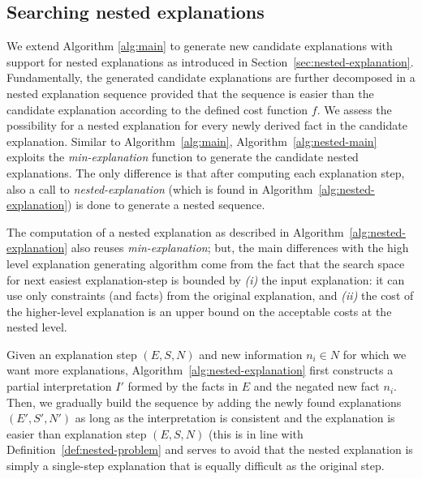 \subsection{Searching nested explanations}

We extend Algorithm \ref{alg:main} to generate new candidate explanations with support for nested explanations as introduced in Section~\ref{sec:nested-explanation}.
Fundamentally, the generated candidate explanations are further decomposed in a nested explanation sequence provided that the sequence is easier than the candidate explanation according to the defined cost function $f$. 
We assess the possibility for a nested explanation for every newly derived fact in the candidate explanation. 
Similar to Algorithm~\ref{alg:main}, Algorithm~\ref{alg:nested-main} exploits the \textit{min-explanation} function to generate the candidate nested explanations. 
The only difference is that after computing each explanation step, also a call to \textit{nested-explanation} (which is found in Algorithm~\ref{alg:nested-explanation}) is done to generate a nested sequence. 


The computation of a nested explanation as described in Algorithm~\ref{alg:nested-explanation} also reuses \textit{min-explanation}; but, the main differences with the high level explanation generating algorithm come from the fact that the search space for next easiest explanation-step is bounded by \emph{(i)} the input explanation: it can use only constraints (and facts) from the original explanation, and \emph{(ii)} the cost of the higher-level explanation is an upper bound on the acceptable costs at the nested level. 

Given an explanation step $(E, S, N)$ and new information $n_i \in N$ for which we want more explanations, Algorithm~\ref{alg:nested-explanation} first constructs a partial interpretation $I'$ formed by the facts in $E$ and the negated new fact $n_i$. 
Then, we gradually build the sequence by adding the newly found explanations $(E', S', N')$ as long as the interpretation is consistent and the explanation is easier than explanation step $(E, S, N)$ (this is in line with Definition~\ref{def:nested-problem} and serves to avoid that the nested explanation is simply a single-step explanation that is equally difficult as the original step.  

